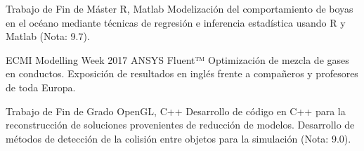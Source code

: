\projitem
    {Trabajo de Fin de Máster}
    {R, Matlab}
    {
        Modelización del comportamiento de boyas en el océano mediante técnicas
        de regresión e inferencia estadística usando R y Matlab (Nota: 9.7).
    }

\projitem
    {ECMI Modelling Week 2017}
    {ANSYS Fluent™}
    {
        Optimización de mezcla de gases en conductos. Exposición de resultados 
        en inglés frente a compañeros y profesores de toda Europa.
    }

\projitem
    {Trabajo de Fin de Grado}
    {OpenGL, C++}
    {
        Desarrollo de código en C++ para la reconstrucción de soluciones provenientes 
        de reducción de modelos. Desarrollo de métodos de detección de la colisión 
        entre objetos para la simulación (Nota: 9.0).
    }
